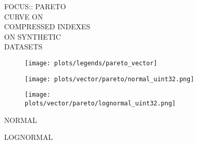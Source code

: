 \documentclass{article}
\begin{document}
\begin{figure}[!htbp]
\fbox
{
\begin{minipage}[t][0.98\textheight][t]{\textwidth}
\centering
    \begin{minipage}{0.23\linewidth}
    \footnotesize{FOCUS::  PARETO\\ CURVE ON \\ COMPRESSED INDEXES \\ ON SYNTHETIC \\ DATASETS}
    \end{minipage}
   \begin{minipage}{0.75\linewidth}
        \begin{figure}[H]
        \texttt{[image: plots/legends/pareto\_vector]}
        \end{figure}
    \end{minipage}
    \vfill

   \begin{minipage}{0.48\linewidth}
        \begin{figure}[H]
        \texttt{[image: plots/vector/pareto/normal\_uint32.png]}
        \end{figure}
    \end{minipage}
    \begin{minipage}{0.48\linewidth}
        \begin{figure}[H]
        \texttt{[image: plots/vector/pareto/lognormal\_uint32.png]}
        \end{figure}
    \end{minipage}
    \begin{minipage}{0.48\linewidth}
    \begin{center}
        NORMAL
    \end{center}
    \end{minipage}
    \begin{minipage}{0.48\linewidth}
    \begin{center}
        LOGNORMAL
    \end{center}
    \end{minipage}

    \vfill


\end{minipage}}
\end{figure}
\end{document}
